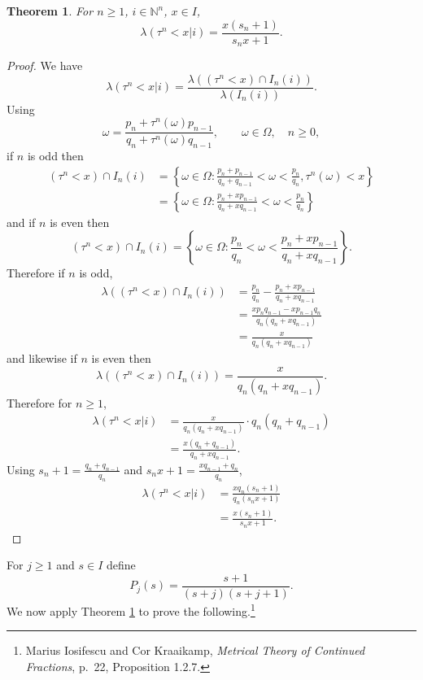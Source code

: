 \documentclass{article}
\newtheorem{theorem}{Theorem}
\theoremstyle{definition}
\begin{document}
\begin{theorem}
For $n \geq 1$, $i \in \mathbb{N}^n$, $x \in I$,
\[
\lambda(\tau^n<x| i) = \frac{x(s_n+1)}{s_nx+1}.
\]
\label{broden}
\end{theorem}
\begin{proof}
We have
\[
\lambda(\tau^n<x| i)=\frac{\lambda((\tau^n<x) \cap I_n(i))}{\lambda(I_n(i))}.
\]
Using
\[
\omega = \frac{p_n+\tau^n(\omega) p_{n-1}}{q_n+\tau^n(\omega) q_{n-1}},\qquad \omega \in \Omega,\quad n \geq 0,
\]
if $n$ is odd then
\begin{align*}
(\tau^n<x) \cap I_n(i) &= \left\{\omega \in \Omega: \frac{p_n+p_{n-1}}{q_n+q_{n-1}}<\omega<\frac{p_n}{q_n},
\tau^n(\omega)<x\right\}\\
&=\left\{ \omega \in \Omega: \frac{p_n+xp_{n-1}}{q_n+xq_{n-1}}<\omega<\frac{p_n}{q_n} \right\}
\end{align*}
and if $n$ is even then
\[
(\tau^n<x) \cap I_n(i) =\left\{ \omega \in \Omega: \frac{p_n}{q_n}<\omega< \frac{p_n+xp_{n-1}}{q_n+xq_{n-1}} \right\}.
\]
Therefore if $n$ is odd,
\begin{align*}
\lambda((\tau^n<x) \cap I_n(i) )&=\frac{p_n}{q_n}-\frac{p_n+xp_{n-1}}{q_n+xq_{n-1}}\\
&=\frac{xp_nq_{n-1}-xp_{n-1}q_n}{q_n(q_n+xq_{n-1})}\\
&=\frac{x}{q_n(q_n+xq_{n-1})}
\end{align*}
and likewise if $n$ is even then
\[
\lambda((\tau^n<x) \cap I_n(i) ) = \frac{x}{q_n(q_n+xq_{n-1})}.
\]
Therefore for $n \geq 1$,
\begin{align*}
\lambda(\tau^n<x| i)&=\frac{x}{q_n(q_n+xq_{n-1})} \cdot q_n(q_n+q_{n-1})\\
&=\frac{x(q_n+q_{n-1})}{q_n+xq_{n-1}}.
\end{align*}
Using $s_n+1 = \frac{q_n+q_{n-1}}{q_n}$ and $s_n x+1=
\frac{xq_{n-1}+q_n}{q_n}$,
\begin{align*}
\lambda(\tau^n<x| i)&=\frac{x q_n(s_n+1)}{q_n(s_nx+1)}\\
&=\frac{x(s_n+1)}{s_nx+1}.
\end{align*}
\end{proof}

For $j \geq 1$ and $s \in I$ define
\[
P_j(s)=\frac{s+1}{(s+j)(s+j+1)}.
\]
We now apply Theorem \ref{broden} to prove the following.\footnote{Marius Iosifescu and Cor Kraaikamp,
{\em Metrical Theory of Continued Fractions}, p.~22, Proposition 1.2.7.}
\end{document}
